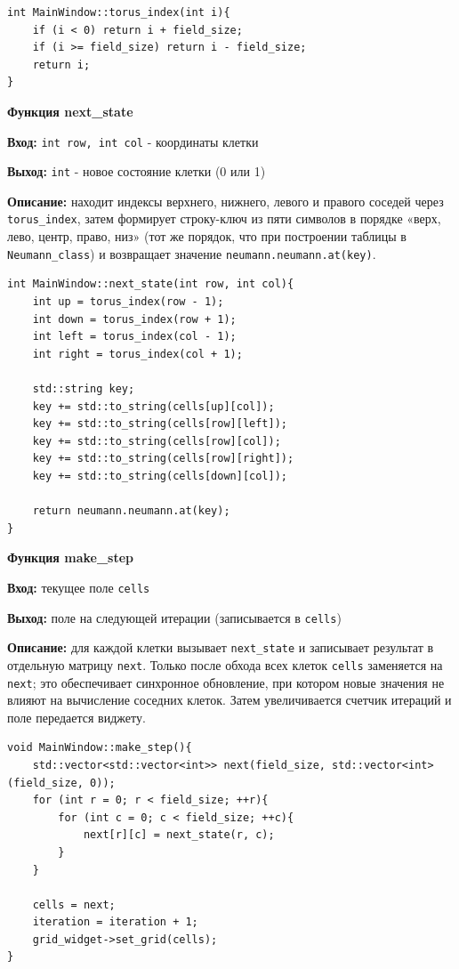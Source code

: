 \begin{lstlisting}[caption=torus\_index, label=lst:torus]
int MainWindow::torus_index(int i){
    if (i < 0) return i + field_size;
    if (i >= field_size) return i - field_size;
    return i;
}
\end{lstlisting}

\newpage
\textbf{Функция next\_state} \par
\textbf{Вход:} \texttt{int row, int col} - координаты клетки \par
\textbf{Выход:} \texttt{int} - новое состояние клетки (0 или 1) \par
\textbf{Описание:} находит индексы верхнего, нижнего, левого и правого соседей через \texttt{torus\_index}, затем формирует строку-ключ из пяти символов в порядке «верх, лево, центр, право, низ» (тот же порядок, что при построении таблицы в \texttt{Neumann\_class}) и возвращает значение \texttt{neumann.neumann.at(key)}.\par

\begin{lstlisting}[caption=next\_state, label=lst:next-state]
int MainWindow::next_state(int row, int col){
    int up = torus_index(row - 1);
    int down = torus_index(row + 1);
    int left = torus_index(col - 1);
    int right = torus_index(col + 1);

    std::string key;
    key += std::to_string(cells[up][col]);
    key += std::to_string(cells[row][left]);
    key += std::to_string(cells[row][col]);
    key += std::to_string(cells[row][right]);
    key += std::to_string(cells[down][col]);

    return neumann.neumann.at(key);
}
\end{lstlisting}

\vspace{6pt}
\textbf{Функция make\_step} \par
\textbf{Вход:} текущее поле \texttt{cells} \par
\textbf{Выход:} поле на следующей итерации (записывается в \texttt{cells}) \par
\textbf{Описание:} для каждой клетки вызывает \texttt{next\_state} и записывает результат в отдельную матрицу \texttt{next}. Только после обхода всех клеток \texttt{cells} заменяется на \texttt{next}; это обеспечивает синхронное обновление, при котором новые значения не влияют на вычисление соседних клеток. Затем увеличивается счетчик итераций и поле передается виджету.\par

\begin{lstlisting}[caption=make\_step, label=lst:make-step]
void MainWindow::make_step(){
    std::vector<std::vector<int>> next(field_size, std::vector<int>(field_size, 0));
    for (int r = 0; r < field_size; ++r){
        for (int c = 0; c < field_size; ++c){
            next[r][c] = next_state(r, c);
        }
    }

    cells = next;
    iteration = iteration + 1;
    grid_widget->set_grid(cells);
}
\end{lstlisting}


